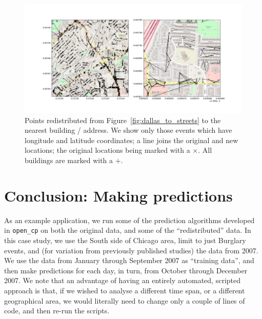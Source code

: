 \documentclass[twoside,a4paper,twocolumn,10pt]{article}
\theoremstyle{plain}
\theoremstyle{definition}
\begin{document}
\begin{figure}
  \includegraphics[width=\textwidth]{dallas_redist_to_buildings.png}
  \caption{Points redistributed from Figure~\ref{fig:dallas_to_streets} to the nearest
building / address.  We show only those events which have longitude and latitude coordinates;
a line joins the original and new locations; the original locations being marked with a
$\times$.  All buildings are marked with a $+$.}
  \label{fig:dallas_to_buildings}
\end{figure}




\section{Conclusion: Making predictions}\label{sec:preds}

As an example application, we run some of the prediction algorithms developed in
\texttt{open\_cp} on both the original data, and some of the ``redistributed'' data.
In this case study, we use the South side of Chicago area, limit to just Burglary events,
and (for variation from
previously published studies) the data from 2007.  We use the data from January through
September 2007 as ``training data'', and then make predictions for each day, in turn, from
October through December 2007.  We note that an advantage of having an entirely automated,
scripted approach is that, if we wished to analyse a different time span, or a different
geographical area, we would literally need to change only a couple of lines of code, and
then re-run the scripts.
\end{document}
